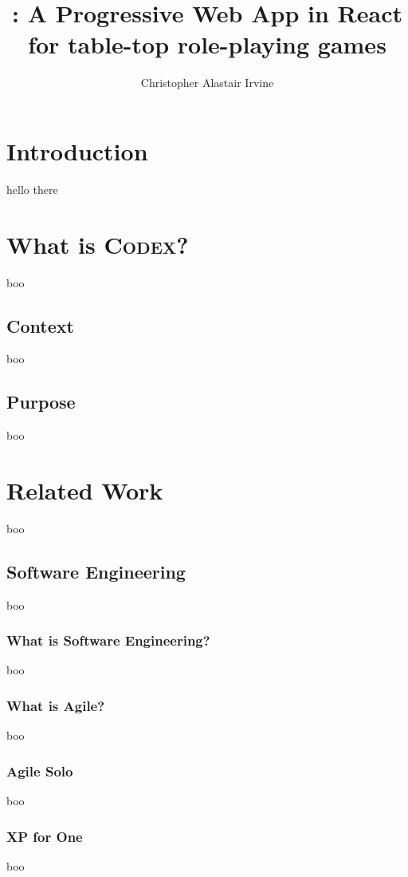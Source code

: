 \documentclass[final]{cmpreport}
\title{\Codex: A Progressive Web App in React for table-top role-playing games}
\author{Christopher Alastair Irvine}
\newcommand{\Codex}{\textsc{Codex}}
\begin{document}
	
	\section{Introduction} \label{sec:introduction}
	hello there
	
	\section{What is \Codex?} \label{sec:what-codex}
	boo
	
		\subsection{Context} \label{sec:context}
		boo
		
		\subsection{Purpose} \label{sec:purpose}
		boo
	
	\section{Related Work} \label{sec:related}
	boo
	
		\subsection{Software Engineering} \label{sec:software-eng}
		boo
			
			\subsubsection{What is Software Engineering?} \label{sec:what-se}
			boo
				
			\subsubsection{What is Agile?} \label{sec:what-agile}
			boo
			
			\subsubsection{Agile Solo} \label{sec:agile-solo}
			boo
			
			\subsubsection{XP for One} \label{sec:xp-for-one}
			boo
			
\end{document}
